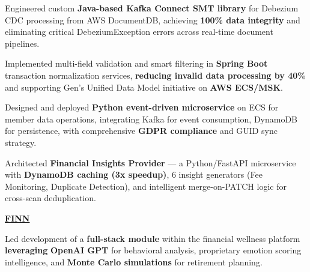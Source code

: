 \documentclass[letterpaper,10pt]{article}
\begin{document}
\begin{resume_list}
    \item Engineered custom \textbf{Java-based Kafka Connect SMT library} for Debezium CDC processing from AWS DocumentDB, achieving \textbf{100\% data integrity} and eliminating critical DebeziumException errors across real-time document pipelines.
    \item Implemented multi-field validation and smart filtering in \textbf{Spring Boot} transaction normalization services, \textbf{reducing invalid data processing by 40\%} and supporting Gen's Unified Data Model  initiative on \textbf{AWS ECS/MSK}.
    \item Designed and deployed \textbf{Python event-driven microservice} on ECS for member data operations, integrating Kafka for event consumption, DynamoDB for persistence, with comprehensive \textbf{GDPR compliance} and GUID sync strategy.
    \item Architected \textbf{Financial Insights Provider} — a Python/FastAPI microservice with \textbf{DynamoDB caching (3x speedup)}, 6 insight generators (Fee Monitoring, Duplicate Detection), and intelligent merge-on-PATCH logic for cross-scan deduplication.
    
    \vspace{3pt}
    \item[] \underline{\textbf{FINN}}
    \item Led development of a \textbf{full-stack module} within the financial wellness platform \textbf{leveraging} \textbf{OpenAI GPT} for behavioral analysis, proprietary emotion scoring intelligence, and \textbf{Monte Carlo simulations} for retirement planning.
\end{resume_list}

\vspace{8pt}
\end{document}
